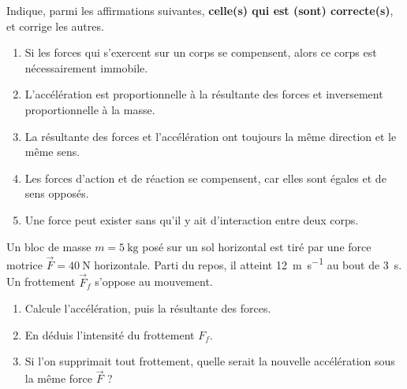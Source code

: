 \documentclass[11pt,a4paper]{article}
\newcommand{\vv}[1]{\vec{#1}}\newcommand{\ds}{\displaystyle}
\begin{document}
\begin{exo}
Indique, parmi les affirmations suivantes, \textbf{celle(s) qui est (sont) correcte(s)}, et corrige les autres.
\begin{enumerate}[label=\arabic*.]
  \item Si les forces qui s'exercent sur un corps se compensent, alors ce corps est nécessairement immobile.
  \item L'accélération est proportionnelle à la résultante des forces et inversement proportionnelle à la masse.
  \item La résultante des forces et l'accélération ont toujours la même direction et le même sens.
  \item Les forces d'action et de réaction se compensent, car elles sont égales et de sens opposés.
  \item Une force peut exister sans qu'il y ait d'interaction entre deux corps.
\end{enumerate}
\end{exo}

\begin{exo}
Un bloc de masse $m=\qty{5}{\kilogram}$ posé sur un sol horizontal est tiré par une force motrice
$\vv F=\qty{40}{\newton}$ horizontale. Parti du repos, il atteint \qty{12}{\metre\per\second} au bout
de \qty{3}{\second}. Un frottement $\vv F_f$ s'oppose au mouvement.
\begin{enumerate}[label=\alph*)]
  \item Calcule l'accélération, puis la résultante des forces.
  \item En déduis l'intensité du frottement $F_f$.
  \item Si l'on supprimait tout frottement, quelle serait la nouvelle accélération sous la même force $\vv F$ ?
\end{enumerate}
\end{exo}
\end{document}
